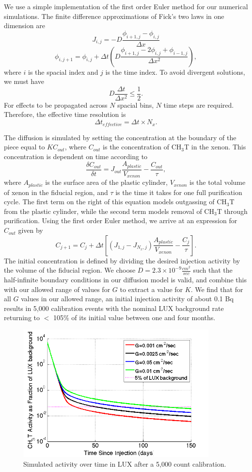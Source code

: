We use a simple implementation of the first order Euler method for our numerical simulations.  The finite difference approximations of Fick's two laws in one dimension are 
\[J_{i,j} = -D \frac{\phi_{i+1,j}-\phi_{i,j}}{\Delta x }\]
\[\phi_{i,j+1} = \phi_{i,j} + \Delta t (D \frac{\phi_{i+1,j} - 2 \phi_{i,j} + \phi_{i-1,j}}{\Delta x^2}),\]
where $i$ is the spacial index and $j$ is the time index.  To avoid divergent solutions, we must have
\[D \frac{\Delta t}{\Delta x^2} \leq \frac{1}{2}.\]
For effects to be propagated across $N$ spacial bins, $N$ time steps are required.  Therefore, the effective time resolution is
\[\Delta t_{effective} = \Delta t \times N_x.\]

The diffusion is simulated by setting the concentration at the boundary of the piece equal to $KC_{out}$, where $C_{out}$ is the concentration of CH$_3$T in the xenon.  This concentration is dependent on time according to
\[\frac{\delta C_{out}}{\delta t} = J_{out} \frac{A_{plastic}}{V_{xenon}}-\frac{C_{out}}{\tau},\]
where $A_{plastic}$ is the surface area of the plastic cylinder, $V_{xenon}$ is the total volume of xenon in the fiducial region, and $\tau$ is the time it takes for one full purification cycle.  The first term on the right of this equation models outgassing of CH$_3$T from the plastic cylinder, while the second term models removal of CH$_3$T through purification.  Using the first order Euler method, we arrive at an expression for $C_{out}$ given by
\[C_{j+1}=C_j + \Delta t [(J_{1,j}-J_{N_x,j})\frac{A_{plastic}}{V_{xenon}}-\frac{C_j}{\tau}].\]
The initial concentration is defined by dividing the desired injection activity by the volume of the fiducial region.  We choose $D = 2.3 \times 10^{-9} \frac {cm^2}{sec}$ such that the half-infinite boundary conditions in our diffusion model is valid, and combine this with our allowed range of values for $G$ to extract a value for $K$.  We find that for all $G$ values in our allowed range, an initial injection activity of about 0.1 Bq results in 5,000 calibration events with the nominal LUX background rate returning to $<$ 105\% of its initial value between one and four months. 

\begin{figure}[H]
\centering
\includegraphics[width=0.9\textwidth]{LUXActivityOverTime.png}
\caption{Simulated activity over time in LUX after a 5,000 count calibration.}
\label{fig:LUXActivity}
\end{figure}

